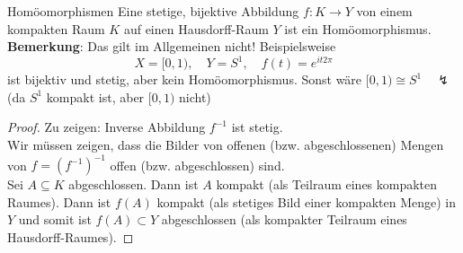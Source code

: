 \begin{theorem}{Homöomorphismen}
  Eine stetige, bijektive Abbildung $ f : K \to Y $ von einem kompakten Raum $ K $ auf einen Hausdorff-Raum $ Y $ ist ein Homöomorphismus. \\
  \textbf{Bemerkung}: Das gilt im Allgemeinen nicht! Beispielsweise
  \begin{equation*}
    X = [0,1), \quad Y = S^1, \quad f(t) = e^{it2\pi}
  \end{equation*}
  ist bijektiv und stetig, aber kein Homöomorphismus. Sonst wäre $ [0,1) \cong S^1 \quad \lightning $ (da $ S^1 $ kompakt ist, aber $ [0,1) $ nicht)
  \begin{proof}
    Zu zeigen: Inverse Abbildung $ f^{-1} $ ist stetig. \\
    Wir müssen zeigen, dass die Bilder von offenen (bzw. abgeschlossenen) Mengen von $ f = \left( f^{-1} \right)^{-1} $ offen (bzw. abgeschlossen) sind. \\
    Sei $ A \subseteq K $ abgeschlossen. Dann ist $ A $ kompakt (als Teilraum eines kompakten Raumes). Dann ist $ f(A) $ kompakt (als stetiges Bild einer kompakten Menge) in $ Y $ und somit ist $ f(A) \subset Y $ abgeschlossen (als kompakter Teilraum eines Hausdorff-Raumes).
  \end{proof}
\end{theorem}